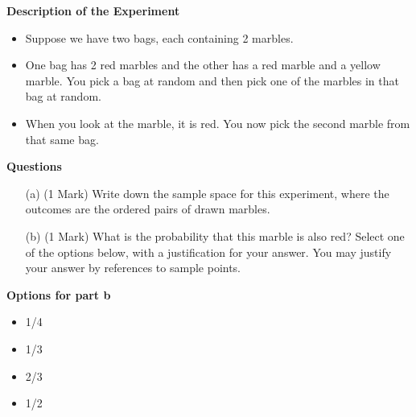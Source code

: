 \textbf{Description of the Experiment}
\begin{itemize}
\item Suppose we have two bags, each containing 2 marbles. 
\item One bag has 2 red marbles and
the other has a red marble and a yellow marble. 
You pick a bag at random and then pick
one of the marbles in that bag at random. 
\item When you look at the marble, it is red. 
You
now pick the second marble from that same bag.
\end{itemize} 
\textbf{Questions}
\begin{itemize}
\item[(a)](1 Mark)  Write down the sample space for this experiment, where the outcomes are the ordered pairs of drawn marbles.
\item[(b)](1 Mark) What is the probability that this marble
is also red? Select one of the options below, with a justification for your answer.
You may justify your answer by references to sample points.
\end{itemize}
\textbf{Options for part b}
\begin{center}
\begin{multicols}{4}
\begin{itemize}
\item 1/4
\item 1/3
\item 2/3
\item  1/2
\end{itemize}
\end{multicols}
\end{center}
